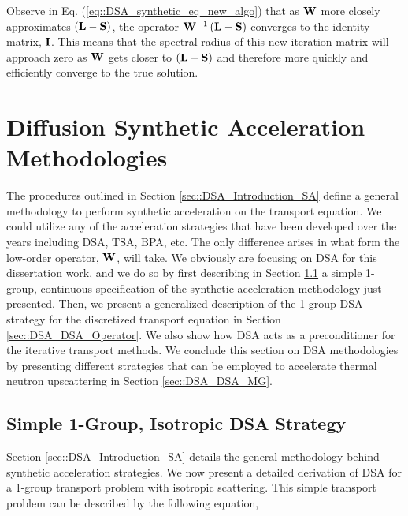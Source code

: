 \noindent Observe in Eq. (\ref{eq::DSA_synthetic_eq_new_algo}) that as ${\bf W}$ more closely approximates $\left(  {\bf L} - {\bf S}  \right)$, the operator ${\bf W}^{-1} \left(  {\bf L} - {\bf S}  \right)$ converges to the identity matrix, ${\bf I}$. This means that the spectral radius of this new iteration matrix will approach zero as ${\bf W}$ gets closer to $\left(  {\bf L} - {\bf S}  \right)$ and therefore more quickly and efficiently converge to the true solution. 

\section{Diffusion Synthetic Acceleration Methodologies}
\label{sec::DSA_DSA}

The procedures outlined in Section \ref{sec::DSA_Introduction_SA} define a general methodology to perform synthetic acceleration on the transport equation. We could utilize any of the acceleration strategies that have been developed over the years including DSA, TSA, BPA, etc. The only difference arises in what form the low-order operator, ${\bf W}$, will take. We obviously are focusing on DSA for this dissertation work, and we do so by first describing in Section \ref{sec::DSA_DSA_1G} a simple 1-group, continuous specification of the synthetic acceleration methodology just presented. Then, we present a generalized description of the 1-group DSA strategy for the discretized transport equation in Section \ref{sec::DSA_DSA_Operator}. We also show how DSA acts as a preconditioner for the iterative transport methods. We conclude this section on DSA methodologies by presenting different strategies that can be employed to accelerate thermal neutron upscattering in Section \ref{sec::DSA_DSA_MG}.

\subsection{Simple 1-Group, Isotropic DSA Strategy}
\label{sec::DSA_DSA_1G}

Section \ref{sec::DSA_Introduction_SA} details the general methodology behind synthetic acceleration strategies. We now present a detailed derivation of DSA for a 1-group transport problem with isotropic scattering. This simple transport problem can be described by the following equation,

